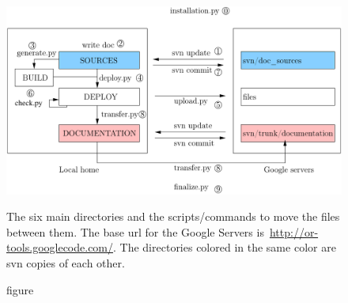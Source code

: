 \documentclass[a4paper,10pt]{article}
\begin{document}
\begin{figure}[h]
   \centering
   \includegraphics[scale=0.8]{images/directories.pdf}
   \caption{figure}{The six main directories and the scripts/commands to move the files between them. The base url for the Google Servers is~\href{http://or-tools.googlecode.com/}{http://or-tools.googlecode.com/}. The directories colored in the same color are svn copies of each other\footnotemark.}\label{pic_directories}
 \end{figure}
\end{document}
